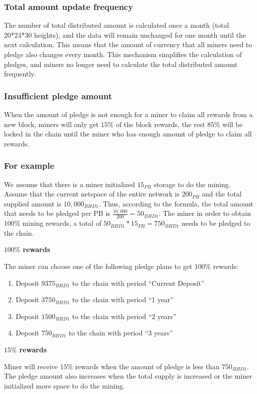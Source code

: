 \subsubsection{Total amount update frequency}
\begin{flushleft}
    The number of total distributed amount is calculated once a month (total 20*24*30 heights), and the data will remain unchanged for one month until the next calculation. This means that the amount of currency that all miners need to pledge also changes every month. This mechanism simplifies the calculation of pledges, and miners no longer need to calculate the total distributed amount frequently.
\end{flushleft}
\subsubsection{Insufficient pledge amount}
\begin{flushleft}
    When the amount of pledge is not enough for a miner to claim all rewards from a new block, miners will only get $15\%$ of the block rewards, the rest $85\%$ will be locked in the chain until the miner who has enough amount of pledge to claim all rewards.
\end{flushleft}
\subsubsection{For example}
\begin{flushleft}
    We assume that there is a miner initialized $15_{PB}$ storage to do the mining. Assume that the current netspace of the entire network is $200_{PB}$ and the total supplied amount is $10,000_{BHD1}$. Thus, according to the formula, the total amount that needs to be pledged per PB is $\frac{10,000}{200}=50_{BHD1}$. The miner in order to obtain $100\%$ mining rewards, a total of $50_{BHD1} * 15_{PB} = 750_{BHD1}$ needs to be pledged to the chain.
\end{flushleft}
\textbf{$100\%$ rewards}
\begin{flushleft}
    The miner can choose one of the following pledge plans to get $100\%$ rewards:
    \begin{enumerate}
        \item Deposit $9375_{BHD1}$ to the chain with period ``Current Deposit''
        \item Deposit $3750_{BHD1}$ to the chain with period ``1 year''
        \item Deposit $1500_{BHD1}$ to the chain with period ``2 years''
        \item Deposit $750_{BHD1}$ to the chain with period ``3 years''
    \end{enumerate}
\end{flushleft}
\textbf{$15\%$ rewards}
\begin{flushleft}
    Miner will receive $15\%$ rewards when the amount of pledge is less than $750_{BHD1}$. The pledge amount also increases when the total supply is increased or the miner initialized more space to do the mining.
\end{flushleft}
